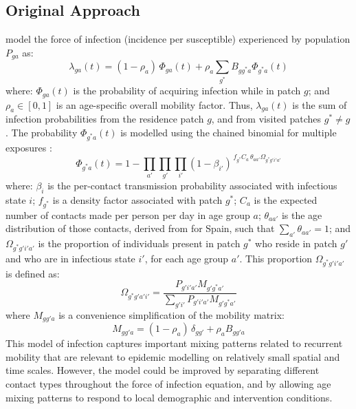\subsection{Original Approach}\label{meth.orig}
\citet{Arenas2020} model the force of infection (incidence per susceptible) experienced by population $P_{ga}$ as:
\begin{equation}\label{eq:Arenas.lambda}
  \lambda_{ga}(t) = (1-\rho_a)\,\Phi_{ga}(t) + \rho_a \sum_{g^*} B_{gg^*a} \Phi_{g^*a}(t)
\end{equation}
where:
$\Phi_{ga}(t)$ is the probability of acquiring infection while in patch $g$;
and $\rho_{a} \in [0,1]$ is an age-specific overall mobility factor.
Thus, $\lambda_{ga}(t)$ is the sum of infection probabilities
from the residence patch $g$, and from visited patches $g^* \ne g$.
The probability $\Phi_{g^*a}(t)$ is modelled using
the chained binomial for multiple exposures \cite{Kaplan1990}:
\begin{equation}\label{eq:Arenas.Phi}
  \Phi_{g^*a}(t) = 1 - \prod_{a'}\prod_{g'} \prod_{i'} {\left(1 - \beta_{i'}\right)}
    ^{\,f_{g^*}C_a\,\theta_{aa'} \Omega_{g^*g'i'a'}}
\end{equation}
where:
$\beta_i$ is the per-contact transmission probability associated with infectious state $i$;
$f_{g^*}$ is a density factor associated with patch $g^*$;
$C_a$ is the expected number of contacts made per person per day in age group $a$;
$\theta_{aa'}$ is the age distribution of those contacts, derived from \cite{Prem2017} for Spain,
such that $\sum_{a'} \theta_{aa'} = 1$;
and $\Omega_{g^*g'i'a'}$ is the proportion of individuals present in patch $g^*$
who reside in patch $g'$ and who are in infectious state $i'$, for each age group $a'$.
This proportion $\Omega_{g^*g'i'a'}$ is defined as:
\begin{equation}\label{eq:Arenas.Omega}
  \Omega_{g^*g'a'i'} = \frac{P_{g'i'a'} M_{g'g^*a'}}{\sum_{g'i'} P_{g'i'a'} M_{g'g^*a'}}
\end{equation}
where $M_{gg'a}$ is a convenience simplification of the mobility matrix:
\begin{equation}\label{eq:Arenas.M}
  M_{gg'a} = (1-\rho_a)\,\delta_{gg'} + \rho_a B_{gg'a}
\end{equation}
This model of infection captures important mixing patterns related to recurrent mobility
that are relevant to epidemic modelling on relatively small spatial and time scales.
However, the model could be improved by
separating different contact types throughout the force of infection equation,
and by allowing age mixing patterns to respond to local demographic and intervention conditions.
